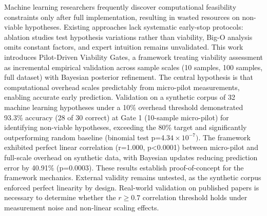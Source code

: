 
Machine learning researchers frequently discover computational feasibility constraints only after full implementation, resulting in wasted resources on non-viable hypotheses. Existing approaches lack systematic early-stop protocols: ablation studies test hypothesis variations rather than viability, Big-O analysis omits constant factors, and expert intuition remains unvalidated. This work introduces Pilot-Driven Viability Gates, a framework treating viability assessment as incremental empirical validation across sample scales (10 samples, 100 samples, full dataset) with Bayesian posterior refinement. The central hypothesis is that computational overhead scales predictably from micro-pilot measurements, enabling accurate early prediction. Validation on a synthetic corpus of 32 machine learning hypotheses under a 10\% overhead threshold demonstrated 93.3\% accuracy (28 of 30 correct) at Gate 1 (10-sample micro-pilot) for identifying non-viable hypotheses, exceeding the 80\% target and significantly outperforming random baseline (binomial test p=4.$34\times 10^{-7})$. The framework exhibited perfect linear correlation (r=1.000, p<0.0001) between micro-pilot and full-scale overhead on synthetic data, with Bayesian updates reducing prediction error by 40.91\% (p=0.0003). These results establish proof-of-concept for the framework mechanics. External validity remains untested, as the synthetic corpus enforced perfect linearity by design. Real-world validation on published papers is necessary to determine whether the $r\geq 0.7$ correlation threshold holds under measurement noise and non-linear scaling effects.
